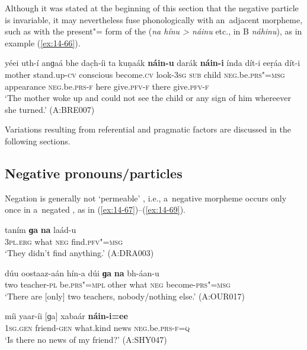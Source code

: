 Although it was stated at the beginning of this section that the negative particle is invariable, it may nevertheless fuse phonologically with an~adjacent morpheme, such as with the present"= form of the  (\textit{na hínu {\textgreater} náinu} etc., in B \textit{náhinu}), as in example (\ref{ex:14-66}).

\ea
\label{ex:14-66}
\gll yéei uth-í anɡaá bhe dac̣h-íi ta kuṇaák \textbf{náin-u} darák \textbf{náin-i} índa dít-i eeṛáa dít-i \\
mother stand.up-\textsc{cv} conscious become.\textsc{cv} look-\textsc{3sg}  \textsc{sub} child \textsc{neg.}be.\textsc{prs"=msg} appearance \textsc{neg.}be.\textsc{prs-f}  here give.\textsc{pfv-f} there give.\textsc{pfv-f} \\
\glt `The mother woke up and could not see the child or any sign of him whereever she turned.' (A:BRE007)
\z

Variations resulting from referential and pragmatic factors are discussed in the following sections.


\subsection{Negative pronouns/particles}
\label{subsec:14-3-2}

Negation is generally not `permeable' \citep[563]{ramat2006}, i.e., a~negative morpheme occurs only once in a~negated , as in (\ref{ex:14-67})--(\ref{ex:14-69}).

\begin{exe}
\ex
\label{ex:14-67}
\gll taním \textbf{ɡa} \textbf{na} laád-u \\
\textsc{3pl.erg} what \textsc{neg} find.\textsc{pfv"=msg}  \\
\glt `They didn't find anything.' (A:DRA003)

\ex
\label{ex:14-68}
\gll dúu oostaaz-aán hín-a dúi \textbf{ɡa} \textbf{na}  bh-áan-u \\
two teacher-\textsc{pl} be.\textsc{prs"=mpl} other what \textsc{neg}  become-\textsc{prs"=msg} \\
\glt `There are [only] two teachers, nobody/nothing else.' (A:OUR017)

\ex
\label{ex:14-69}
\gll míi yaar-íi [ɡa] xabaár \textbf{náin-i=ee} \\
\textsc{1sg.gen} friend-\textsc{gen} what.kind news \textsc{neg}.be.\textsc{prs-f=q}  \\
\glt `Is there no news of my friend?' (A:SHY047)
\end{exe}

